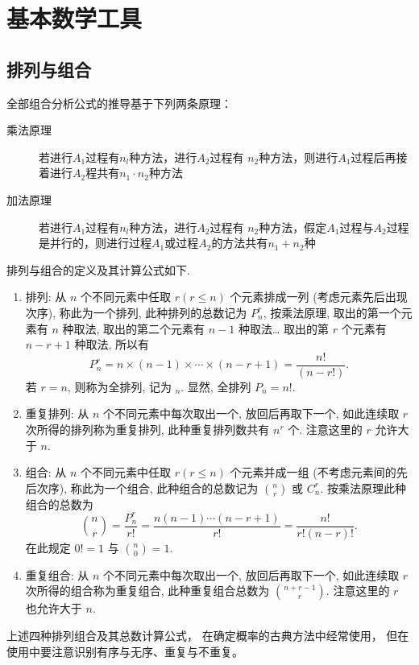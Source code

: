 \chapter{基本数学工具}

\section{排列与组合}

全部组合分析公式的推导基于下列两条原理：
\begin{description}
    \item[乘法原理] 若进行$A_1$过程有$n_l$种方法，进行$A_2$过程有 $n_2$种方法，则进行$A_1$过程后再接着进行$A_2$程共有$n_1 \cdot  n_2$种方法
    \item[加法原理] 若进行$A_1$过程有$n_l$种方法，进行$A_2$过程有 $n_2$种方法，假定$A_1$过程与$A_2$过程是并行的，则进行过程$A_1$或过程$A_2$的方法共有$n_1 +n_2$种
\end{description}

排列与组合的定义及其计算公式如下.
\begin{enumerate}
  \item 排列:
  从 $n$ 个不同元素中任取 $r (r \le n)$ 个元素排成一列 (考虑元素先后出现次序),
  称此为一个排列,
  此种排列的总数记为 $P_n^r$,
  按乘法原理,
  取出的第一个元素有 $n$ 种取法,
  取出的第二个元素有 $n - 1$ 种取法\dots
  取出的第 $r$ 个元素有 $n - r + 1$ 种取法,
  所以有
  \begin{equation}
    P_n^r = n \times (n - 1) \times \dotsb \times (n - r + 1) = \frac{n!}{(n - r!)}.\label{eq1.2.2}
  \end{equation}
  若 $r = n$,
  则称为全排列,
  记为 $_n$.
  显然,
  全排列 $P_n = n!$.

  \item 重复排列:
  从 $n$ 个不同元素中每次取出一个,
  放回后再取下一个,
  如此连续取 $r$ 次所得的排列称为重复排列,
  此种重复排列数共有 $n^r$ 个.
  注意这里的 $r$ 允许大于 $n$.

  \item 组合:
  从 $n$ 个不同元素中任取 $r (r \le n)$ 个元素并成一组 (不考虑元素间的先后次序),
  称此为一个组合,
  此种组合的总数记为 $\binom{n}{r}$ 或 $C_n^r$.
  按乘法原理此种组合的总数为
  \begin{equation}
    \binom{n}{r} = \frac{P_n^r}{r!} = \frac{n (n - 1) \dotsb (n - r + 1)}{r!} = \frac{n!}{r! (n - r)!}.\label{eq1.2.3}
  \end{equation}
  在此规定 $0! = 1$ 与 $\binom{n}{0} = 1$.

  \item 重复组合:
  从 $n$ 个不同元素中每次取出一个,
  放回后再取下一个,
  如此连续取 $r$ 次所得的组合称为重复组合,
  此种重复组合总数为 $\binom{n + r - 1}{r}$.
  注意这里的 $r$ 也允许大于 $n$.
\end{enumerate}

上述四种排列组合及其总数计算公式，
在确定概率的古典方法中经常使用，
但在使用中要注意识别有序与无序、重复与不重复。